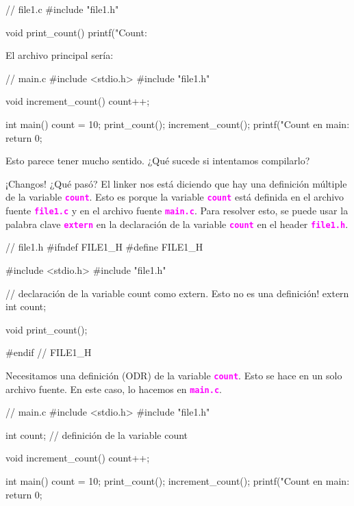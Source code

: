 \documentclass[]{scrartcl}
\newcommand{\hl}[1]{\textcolor{magenta}{\textbf{\texttt{#1}}}}
\begin{document}
\begin{cbox}[]{}
  // file1.c
  #include "file1.h"

  void print_count(){
    printf("Count: %
  }
\end{cbox}

El archivo principal sería:

\begin{cbox}[]{}
  // main.c
  #include <stdio.h>
  #include "file1.h"

  void increment_count() {
    count++;
  }
  
  int main() {
    count = 10;
    print_count();
    increment_count();
    printf("Count en main: %
    return 0;
  }
\end{cbox}

Esto parece tener mucho sentido. ¿Qué sucede si intentamos compilarlo?


¡Changos! ¿Qué pasó? El linker nos está diciendo que hay una definición múltiple de la variable \hl{count}. Esto es porque la variable \hl{count} está definida en el archivo fuente \hl{file1.c} y en el archivo fuente \hl{main.c}. Para resolver esto, se puede usar la palabra clave \hl{extern} en la declaración de la variable \hl{count} en el header \hl{file1.h}.
\begin{cbox}[]{}
  // file1.h
  #ifndef FILE1_H
  #define FILE1_H

  #include <stdio.h>
  #include "file1.h"
  
  // declaración de la variable count como extern. Esto no es una definición!
  extern int count; 

  void print_count();

  #endif // FILE1_H
\end{cbox}

Necesitamos una definición (ODR) de la variable \hl{count}. Esto se hace en un solo archivo fuente. En este caso, lo hacemos en \hl{main.c}.

\begin{cbox}[]{}
  // main.c
  #include <stdio.h>
  #include "file1.h"

  int count; // definición de la variable count

  void increment_count() {
    count++;
  }
  
  int main() {
    count = 10;
    print_count();
    increment_count();
    printf("Count en main: %
    return 0;
  }
\end{cbox}
\end{document}

